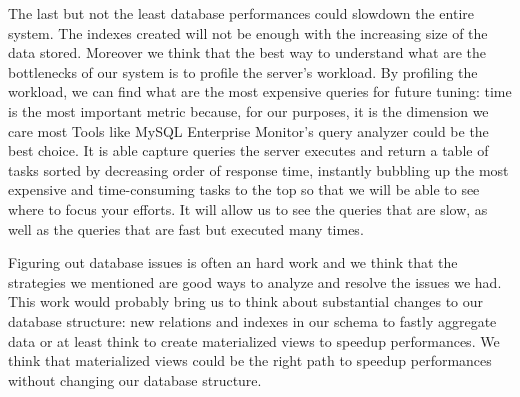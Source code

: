 \documentclass[a4paper,13pt]{report}
\begin{document}
The last but not the least database performances could slowdown the entire system. The indexes created  will not be enough with the increasing size of the data stored.
Moreover we think that the best way to understand what are the bottlenecks of our system is to profile the server's workload. By profiling the workload, we can find what are the most expensive queries for future tuning: time is the most important metric because, for our purposes, it is the dimension we care most
Tools like MySQL Enterprise Monitor's query analyzer could be the best choice. It is able capture queries the server executes and return a table of tasks sorted by decreasing order of response time, instantly bubbling up the most expensive and time-consuming tasks to the top so that we will be able to see where to focus your efforts.
It  will allow us to see the queries that are slow, as well as the queries that are fast but executed many times.

Figuring out database issues is often an hard work and we think that the strategies we mentioned are good ways to analyze and resolve the issues we had.
This work would probably bring us to think about  substantial changes to our database structure: new relations and indexes in our schema to fastly aggregate data or at least think to create materialized views to speedup performances.
We think that materialized views could be the right path to speedup performances without changing our database structure.\newline
\cleardoublepage
{}

\end{document}
